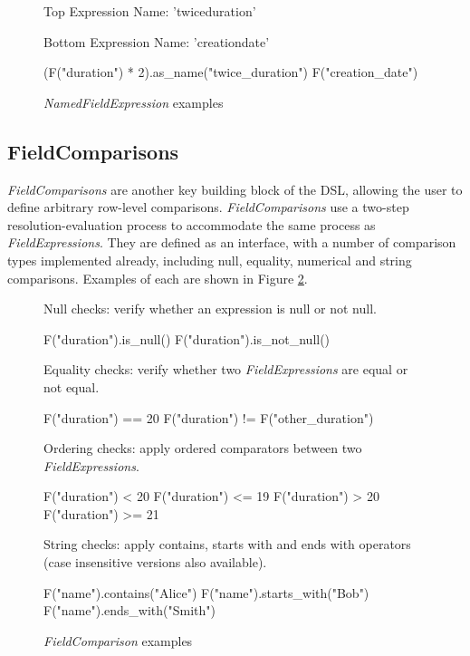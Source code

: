 \begin{figure}[ht]
	Top Expression Name: 'twice\textunderscore duration'
	
	Bottom Expression Name: 'creation\textunderscore date'
	\begin{python}
(F("duration") * 2).as_name("twice_duration")
F("creation_date")
	\end{python}
	\caption{\textit{NamedFieldExpression} examples}
	\label{fig:namedfieldexpression-examples}
\end{figure}

\subsection{FieldComparisons}\label{subsec:fieldcomparisons}
\textit{FieldComparisons} are another key building block of the DSL, allowing the user to define arbitrary row-level comparisons. \textit{FieldComparisons} use a two-step resolution-evaluation process to accommodate the same process as \textit{FieldExpressions}. They are defined as an interface, with a number of comparison types implemented already, including null, equality, numerical and string comparisons. Examples of each are shown in Figure \ref{fig:field-comparisons-examples}.

\begin{figure}[htp]
	Null checks: verify whether an expression is null or not null.
	\begin{python}
F("duration").is_null()
F("duration").is_not_null()
	\end{python}
	
	Equality checks: verify whether two \textit{FieldExpressions} are equal or not equal. 
	\begin{python}
F("duration") == 20
F("duration") != F("other_duration")
	\end{python}

	Ordering checks: apply ordered comparators between two \textit{FieldExpressions}.
	\begin{python}
F("duration") < 20
F("duration") <= 19
F("duration") > 20
F("duration") >= 21
	\end{python}

	String checks: apply contains, starts with and ends with operators (case insensitive versions also available).
	\begin{python}
F("name").contains("Alice")
F("name").starts_with("Bob")
F("name").ends_with("Smith")
	\end{python}
	\caption{\textit{FieldComparison} examples}
	\label{fig:field-comparisons-examples}
\end{figure}

